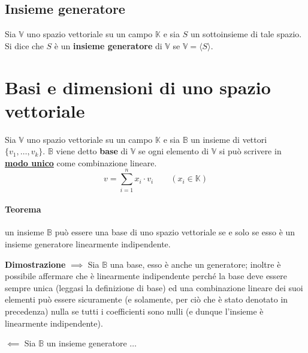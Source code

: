 		
		\subsection{Insieme generatore}
			Sia $\mathbb{V}$ uno spazio vettoriale su un campo $\mathbb{K}$ e sia $S$ un sottoinsieme di tale spazio. Si dice che $S$ è un \textbf{insieme generatore} di $\mathbb{V}$ se $\mathbb{V} = \langle S \rangle $.
			
	\section{Basi e dimensioni di uno spazio vettoriale}
		Sia $\mathbb{V}$ uno spazio vettoriale su un campo $\mathbb{K}$ e sia $\mathbb{B}$ un insieme di vettori $\{ v_1, \dots, v_k \}$.
		$\mathbb{B}$ viene detto \textbf{base} di $\mathbb{V}$ se ogni elemento di $\mathbb{V}$ si può scrivere in \underline{\textbf{modo unico}} come combinazione lineare.
		$$ v = \sum_{i=1}^{n} x_i \cdot v_i \qquad (x_i \in \mathbb{K}) $$
		
		\paragraph{Teorema} un insieme $\mathbb{B}$ può essere una base di uno spazio vettoriale se e solo se esso è un insieme generatore linearmente indipendente.
		\begin{GrayBox}
			\textbf{Dimostrazione} \newline
			\textbf{$\implies$} Sia $\mathbb{B}$ una base, esso è anche un generatore; inoltre è possibile affermare che è linearmente indipendente perché la base deve essere sempre unica (leggasi la definizione di base) ed una combinazione lineare dei suoi elementi può essere sicuramente (e solamente, per ciò che è stato denotato in precedenza) nulla se tutti i coefficienti sono nulli (e dunque l'insieme è linearmente indipendente).
			
			\textbf{$\impliedby$} Sia $\mathbb{B}$ un insieme generatore $\dots$
		\end{GrayBox}
		
			 
	